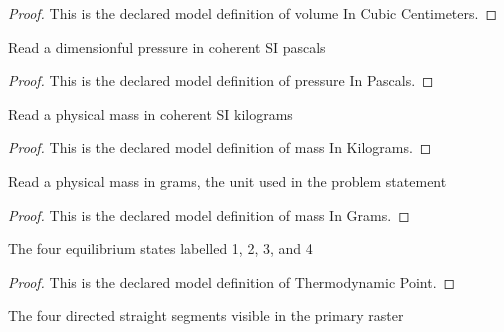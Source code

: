\begin{proof}
  This is the declared model definition of volume In Cubic Centimeters.
\end{proof}
\begin{definition}
  \label{def:physics:phyx-mini-0368:phyxminiproblems-problemphyxmini0368-pressureinpascals}
  Read a dimensionful pressure in coherent SI pascals
\end{definition}
\begin{proof}
  This is the declared model definition of pressure In Pascals.
\end{proof}
\begin{definition}
  \label{def:physics:phyx-mini-0368:phyxminiproblems-problemphyxmini0368-massinkilograms}
  Read a physical mass in coherent SI kilograms
\end{definition}
\begin{proof}
  This is the declared model definition of mass In Kilograms.
\end{proof}
\begin{definition}
  \label{def:physics:phyx-mini-0368:phyxminiproblems-problemphyxmini0368-massingrams}
  Read a physical mass in grams, the unit used in the problem statement
\end{definition}
\begin{proof}
  This is the declared model definition of mass In Grams.
\end{proof}
\begin{definition}
  \label{def:physics:phyx-mini-0368:phyxminiproblems-problemphyxmini0368-thermodynamicpoint}
  The four equilibrium states labelled 1, 2, 3, and 4
\end{definition}
\begin{proof}
  This is the declared model definition of Thermodynamic Point.
\end{proof}
\begin{definition}
  \label{def:physics:phyx-mini-0368:phyxminiproblems-problemphyxmini0368-processleg}
  The four directed straight segments visible in the primary raster
\end{definition}
